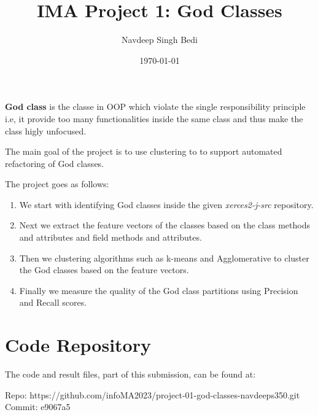 \documentclass{article}
\title{IMA Project 1: God Classes}
\author{{Navdeep Singh Bedi} }
\date{\today}
\begin{document}
\setcounter{section}{-1}

\maketitle



\textbf{God class} is the classe in OOP which violate the single responsibility principle i.e, it provide
too many functionalities inside the same class and thus make the class higly unfocused.

The main goal of the project is to use clustering to to support automated refactoring of God classes. 

The project goes as follows: 

\begin{enumerate}
    \item We start with identifying God classes inside the given \textit{xerces2-j-src} repository.
    \item Next we extract the feature vectors of the classes based on the class methods and attributes and field methods and attributes.
    \item Then we clustering algorithms such as k-means and Agglomerative to cluster the God classes based on the feature vectors.
    \item Finally we measure the quality of the God class partitions using Precision and Recall scores.
\end{enumerate}

\section{Code Repository}

The code and result files, part of this submission, can be found at:

\begin{center}
    Repo: {https://github.com/infoMA2023/project-01-god-classes-navdeeps350.git} \\
    Commit: e9067a5
\end{center}
\end{document}
